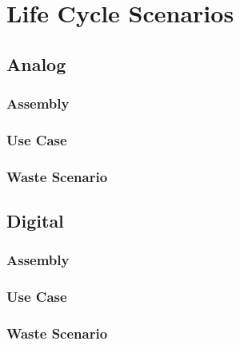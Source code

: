 \section{Life Cycle Scenarios}\label{sec:scenarios}


\subsection{Analog}\label{subsec:analog_scenario}

\subsubsection*{Assembly}

\subsubsection*{Use Case}

\subsubsection*{Waste Scenario}


\subsection{Digital}\label{subsec:digital_scenario}

\subsubsection*{Assembly}

\subsubsection*{Use Case}

\subsubsection*{Waste Scenario}
